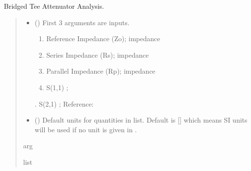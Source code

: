 \documentclass[letterpaper,10pt,english]{sphinxmanual}
\begin{document}

\begin{fulllineitems}
\label{\detokenize{components:components.Bridged_Tee_Attenuator_Analysis}}
\pysigstartsignatures
{}
\pysigstopsignatures
\sphinxAtStartPar
Bridged Tee Attenuator Analysis.
\begin{quote}\begin{description}
\begin{itemize}
\item {} 
\sphinxAtStartPar
{} () \textendash{} 
\sphinxAtStartPar
First 3 arguments are inputs.
\begin{enumerate}
%
\item {} 
\sphinxAtStartPar
Reference Impedance (Zo); impedance

\item {} 
\sphinxAtStartPar
Series Impedance (Rs); impedance

\item {} 
\sphinxAtStartPar
Parallel Impedance (Rp); impedance

\item {} 
\sphinxAtStartPar
S(1,1) ;

\end{enumerate}

. S(2,1) ;
Reference:


\item {} 
\sphinxAtStartPar
{} (\sphinxstyleliteralemphasis{\sphinxupquote{, }}) \textendash{} Default units for quantities in  list. Default is {[}{]} which means SI units will be used if no unit is given in .

\end{itemize}

\sphinxAtStartPar
arg

\sphinxAtStartPar
list

\end{description}\end{quote}

\end{fulllineitems}
\end{document}
